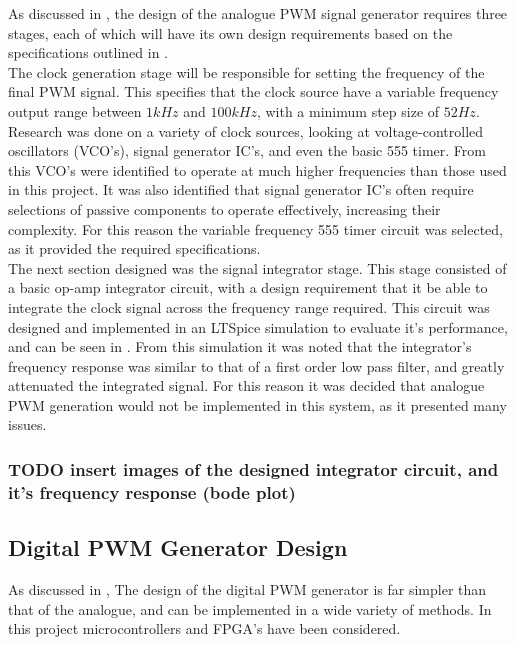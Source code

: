 As discussed in , the design of the analogue PWM signal generator requires three stages, each of which will have its own design requirements based on the specifications outlined in . \\

The clock generation stage will be responsible for setting the frequency of the final PWM signal. This specifies that the clock source have a variable frequency output range between $1kHz$ and $100kHz$, with a minimum step size of $52Hz$. Research was done on a variety of clock sources, looking at voltage-controlled oscillators (VCO's), signal generator IC's, and even the basic 555 timer. From this VCO's were identified to operate at much higher frequencies than those used in this project. It was also identified that signal generator IC's often require selections of passive components to operate effectively, increasing their complexity. For this reason the variable frequency 555 timer circuit was selected, as it provided the required specifications.\\

The next section designed was the signal integrator stage. This stage consisted of a basic op-amp integrator circuit, with a design requirement that it be able to integrate the clock signal across the frequency range required. This circuit was designed and implemented in an LTSpice simulation to evaluate it's performance, and can be seen in . From this simulation it was noted that the integrator's frequency response was similar to that of a first order low pass filter, and greatly attenuated the integrated signal. For this reason it was decided that analogue PWM generation would not be implemented in this system, as it presented many issues.

\subsubsection{TODO insert images of the designed integrator circuit, and it's frequency response (bode plot)} 

\subsection{Digital PWM Generator Design}\label{S:PWM_digital_design}

As discussed in , The design of the digital PWM generator is far simpler than that of the analogue, and can be implemented in a wide variety of methods. In this project microcontrollers and FPGA's have been considered.

